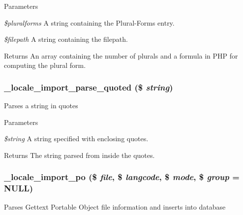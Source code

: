 \begin{DoxyParams}{Parameters}
\item[{\em \$pluralforms}]A string containing the Plural-\/Forms entry. \item[{\em \$filepath}]A string containing the filepath.\end{DoxyParams}
\begin{DoxyReturn}{Returns}
An array containing the number of plurals and a formula in PHP for computing the plural form. 
\end{DoxyReturn}
\hypertarget{group__locale_gaac1954e79c57539b5599ff4ed7379df7}{
\subsubsection[{\_\-locale\_\-import\_\-parse\_\-quoted}]{\setlength{\rightskip}{0pt plus 5cm}\_\-locale\_\-import\_\-parse\_\-quoted (\$ {\em string})}}
\label{group__locale_gaac1954e79c57539b5599ff4ed7379df7}
Parses a string in quotes


\begin{DoxyParams}{Parameters}
\item[{\em \$string}]A string specified with enclosing quotes.\end{DoxyParams}
\begin{DoxyReturn}{Returns}
The string parsed from inside the quotes. 
\end{DoxyReturn}
\hypertarget{group__locale_ga5d3d163017bea9499839ef6be09807de}{
\subsubsection[{\_\-locale\_\-import\_\-po}]{\setlength{\rightskip}{0pt plus 5cm}\_\-locale\_\-import\_\-po (\$ {\em file}, \/  \$ {\em langcode}, \/  \$ {\em mode}, \/  \$ {\em group} = {\ttfamily NULL})}}
\label{group__locale_ga5d3d163017bea9499839ef6be09807de}
Parses Gettext Portable Object file information and inserts into database


